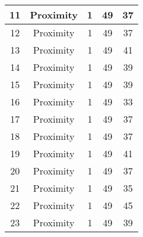 \documentclass[results.tex]{subfiles}
\begin{document}
\begin{center}
\begin{tabular}{| c || c | c | c | c |}
            \hline
            11                      & Proximity                    & 1                      & 49                      & 37                   \\
            \hline
            12                      & Proximity                    & 1                      & 49                      & 37                   \\
            \hline
            13                      & Proximity                    & 1                      & 49                      & 41                   \\
            \hline
            14                      & Proximity                    & 1                      & 49                      & 39                   \\
            \hline
            15                      & Proximity                    & 1                      & 49                      & 39                   \\
            \hline
            16                      & Proximity                    & 1                      & 49                      & 33                   \\
            \hline
            17                      & Proximity                    & 1                      & 49                      & 37                   \\
            \hline
            18                      & Proximity                    & 1                      & 49                      & 37                   \\
            \hline
            19                      & Proximity                    & 1                      & 49                      & 41                   \\
            \hline
            20                      & Proximity                    & 1                      & 49                      & 37                   \\
            \hline
            21                      & Proximity                    & 1                      & 49                      & 35                   \\
            \hline
            22                      & Proximity                    & 1                      & 49                      & 45                   \\
            \hline
            23                      & Proximity                    & 1                      & 49                      & 39                   \\

\end{tabular}
\end{center}
\end{document}
